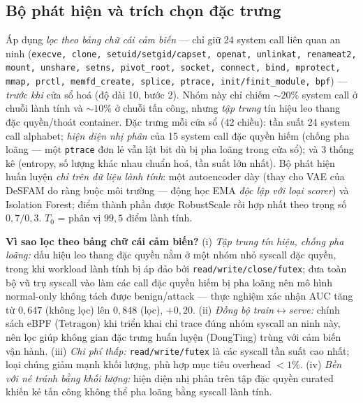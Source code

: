 \documentclass[conference,10pt]{IEEEtran}
\begin{document}
\subsection{Bộ phát hiện và trích chọn đặc trưng}
Áp dụng \textit{lọc theo bảng chữ cái cảm biến} — chỉ giữ 24 system call liên quan an ninh (\texttt{execve, clone, setuid/setgid/capset, openat, unlinkat, renameat2, mount, unshare, setns, pivot\_root, socket, connect, bind, mprotect, mmap, prctl, memfd\_create, splice, ptrace, init/finit\_module, bpf}) — \textit{trước khi} cửa sổ hoá (độ dài 10, bước 2). Nhóm này chỉ chiếm $\sim 20\%$ system call ở chuỗi lành tính và $\sim 10\%$ ở chuỗi tấn công, nhưng \textit{tập trung} tín hiệu leo thang đặc quyền/thoát container. Đặc trưng mỗi cửa sổ (42 chiều): tần suất 24 system call alphabet; \textit{hiện diện nhị phân} của 15 system call đặc quyền hiếm (chống pha loãng — một \texttt{ptrace} đơn lẻ vẫn lật bit dù bị pha loãng trong cửa sổ); và 3 thống kê (entropy, số lượng khác nhau chuẩn hoá, tần suất lớn nhất). Bộ phát hiện huấn luyện \textit{chỉ trên dữ liệu lành tính}: một autoencoder dày (thay cho VAE của DeSFAM do ràng buộc môi trường — động học EMA \textit{độc lập với loại scorer}) và Isolation Forest; điểm thành phần được RobustScale rồi hợp nhất theo trọng số $0{,}7/0{,}3$. $T_0$ = phân vị $99{,}5$ điểm lành tính.

\textbf{Vì sao lọc theo bảng chữ cái cảm biến?} (i) \textit{Tập trung tín hiệu, chống pha loãng:} dấu hiệu leo thang đặc quyền nằm ở một nhóm nhỏ syscall đặc quyền, trong khi workload lành tính bị áp đảo bởi \texttt{read/write/close/futex}; đưa toàn bộ vũ trụ syscall vào làm các call đặc quyền hiếm bị pha loãng nên mô hình normal-only không tách được benign/attack — thực nghiệm xác nhận AUC tăng từ $0{,}647$ (không lọc) lên $0{,}848$ (lọc), $+0{,}20$. (ii) \textit{Đồng bộ train$\leftrightarrow$serve:} chính sách eBPF (Tetragon) khi triển khai chỉ trace đúng nhóm syscall an ninh này, nên lọc giúp không gian đặc trưng huấn luyện (DongTing) trùng với cảm biến vận hành. (iii) \textit{Chi phí thấp:} \texttt{read/write/futex} là các syscall tần suất cao nhất; loại chúng giảm mạnh khối lượng, phù hợp mục tiêu overhead $<1\%$. (iv) \textit{Bền với né tránh bằng khối lượng:} hiện diện nhị phân trên tập đặc quyền curated khiến kẻ tấn công không thể pha loãng bằng syscall lành tính.
\end{document}
